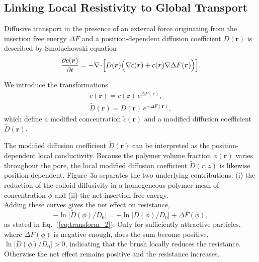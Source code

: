 \documentclass[12pt, a4paper]{article}
\begin{document}
\subsection*{Linking Local Resistivity to Global Transport}

Diffusive transport in the presence of an external force originating from the insertion free energy $\Delta F$ and a position-dependent diffusion coefficient $D(\bm r)$ is described by Smoluchowski equation
\begin{equation}
  \frac{\partial c(\bm r)}{\partial t}
  = -\nabla\!\cdot\!\Bigl[
     D(\bm r)\Bigl(\nabla c(\bm r)+c(\bm r)\nabla\Delta F(\bm r)\Bigr)
     \Bigr].
  \label{eq:Smoluch}
\end{equation}

We introduce the transformations
\begin{eqnarray}
  \tilde c(\bm r)=c(\bm r)\,e^{\Delta F(\bm r)}, \label{eq:transform_1}\\
  \tilde D(\bm r)=D(\bm r)\,e^{-\Delta F(\bm r)}, \label{eq:transform_2}
\end{eqnarray}
which define a modified concentration $\tilde c(\bm r)$ and a modified diffusion coefficient $\tilde D(\bm r)$.

The modified diffusion coefficient $\tilde D(\bm r)$ can be interpreted as the position-dependent local conductivity.
Because the polymer volume fraction $\phi(\bm{r})$ varies throughout the pore, the local modified diffusion coefficient $\tilde{D}(r,z)$ is likewise position-dependent.
Figure~3a %
separates the two underlying contributions:
(i) the reduction of the colloid diffusivity in a homogeneous polymer mesh of concentration $\phi$ and
(ii) the net insertion free energy.\\
Adding these curves gives the net effect on resistance,
\begin{equation*}
    -\ln\!\bigl[\tilde {D}(\phi)/D_{0}\bigr]= -\ln\!\bigl[D(\phi)/D_{0}\bigr] + \Delta F(\phi),
\end{equation*}
as stated in Eq.~(\ref{eq:transform_2}). 
Only for sufficiently attractive particles, where $\Delta F(\phi)$ is negative enough, does the sum become positive, $\ln\!\bigl[\tilde {D}(\phi)/D_{0}\bigr] > 0$, indicating that the brush locally reduces the resistance.  
Otherwise the net effect remains positive and the resistance increases.
\end{document}

